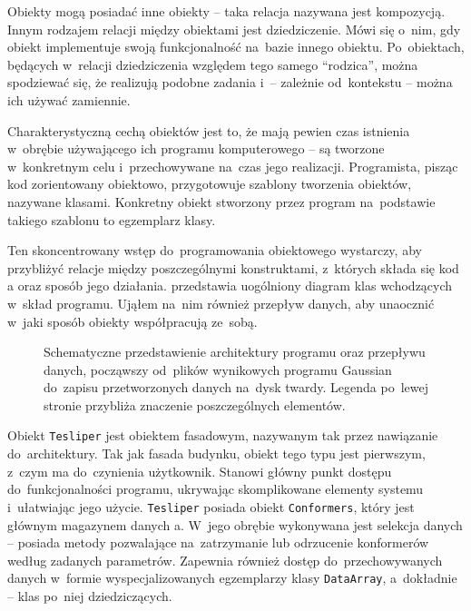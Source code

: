 Obiekty mogą posiadać inne obiekty \--- taka relacja nazywana jest kompozycją.
Innym rodzajem relacji między obiektami jest dziedziczenie.
Mówi się o~nim, gdy obiekt implementuje swoją funkcjonalność na~bazie innego obiektu.
Po~obiektach, będących w~relacji dziedziczenia względem tego samego \enquote{rodzica},
  można spodziewać się, że realizują podobne zadania i~\--- zależnie od~kontekstu \--- 
  można ich używać zamiennie.

Charakterystyczną cechą obiektów jest to, że mają pewien czas istnienia w~obrębie używającego ich
  programu komputerowego \--- są tworzone w~konkretnym celu i~przechowywane na~czas jego realizacji.
Programista, pisząc kod zorientowany obiektowo, przygotowuje szablony tworzenia obiektów,
  nazywane klasami.
Konkretny obiekt stworzony przez program na~podstawie takiego szablonu to egzemplarz klasy.

Ten skoncentrowany wstęp do~programowania obiektowego wystarczy, aby przybliżyć relacje między
  poszczególnymi konstruktami, z~których składa się kod \tesliper{}a oraz sposób jego działania.
 przedstawia uogólniony diagram klas wchodzących w~skład programu.
Ująłem na~nim również przepływ danych, aby unaocznić w~jaki sposób obiekty współpracują ze~sobą.

\begin{figure}
  
  \caption{
    Schematyczne przedstawienie architektury programu \tesliper{} oraz przepływu danych,
      począwszy od~plików wynikowych programu Gaussian do~zapisu przetworzonych danych
      na~dysk twardy.
    Legenda po~lewej stronie przybliża znaczenie poszczególnych elementów.
  }
  \label{fig:class-diagram}
\end{figure}

Obiekt \texttt{Tesliper} jest obiektem fasadowym, nazywanym tak przez nawiązanie do~architektury.
Tak jak fasada budynku, obiekt tego typu jest pierwszym, z~czym ma do~czynienia użytkownik.
Stanowi główny punkt dostępu do~funkcjonalności programu, ukrywając skomplikowane elementy
  systemu i~ułatwiając jego użycie.
\texttt{Tesliper} posiada obiekt \texttt{Conformers},
  który jest głównym magazynem danych \tesliper{}a.
W~jego obrębie wykonywana jest selekcja danych \--- posiada metody pozwalające
  na~zatrzymanie lub odrzucenie
  konformerów według zadanych parametrów.
Zapewnia również dostęp do~przechowywanych danych w~formie wyspecjalizowanych egzemplarzy
  klasy \texttt{DataArray}, a~dokładnie \--- klas po~niej dziedziczących.

